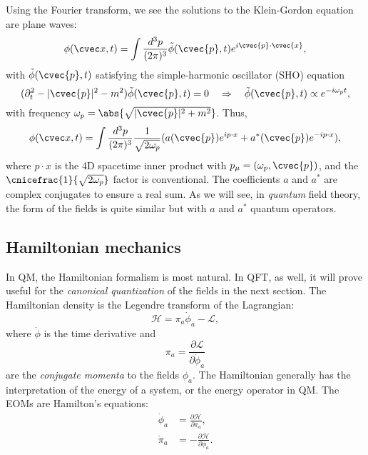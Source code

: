 Using the Fourier transform, we see the solutions to the Klein-Gordon equation are plane waves:
\begin{equation}
	\label{eq:01_qft_field_kg_solutions}
	\phi(\cvec x, t) = \int \frac{d^3p}{(2\pi)^3} \tilde \phi(\cvec{p}, t) e^{i\cvec{p}\cdot\cvec{x}},
\end{equation}
with $\tilde \phi(\cvec{p}, t)$ satisfying the simple-harmonic oscillator (SHO) equation
\begin{equation}
	\label{eq:01_qft_field_kg_sho}
	(\partial_t^2 - |\cvec{p}|^2 - m^2)\tilde \phi(\cvec{p}, t) = 0 \quad \Rightarrow \quad \tilde \phi(\cvec{p}, t) \propto e^{-i\omega_p t},
\end{equation}
with frequency $\omega_p = \abs{\sqrt{|\cvec{p}|^2 + m^2}}$.
Thus, 
\begin{equation}
	\label{eq:01_qft_field_kg_solutions_final}
	\phi(\cvec x, t) = \int \frac{d^3p}{(2\pi)^3} \frac{1}{\sqrt{2\omega_p}} (a(\cvec{p})e^{ip\cdot x} + a^*(\cvec{p})e^{-ip\cdot x}),
\end{equation}
where $p\cdot x$ is the 4D spacetime inner product with $p_\mu = (\omega_p, \cvec{p})$, and the $\cnicefrac{1}{\sqrt{2\omega_p}}$ factor is conventional.
The coefficients $a$ and $a^*$ are complex conjugates to ensure a real sum.
As we will see, in \textit{quantum} field theory, the form of the fields is quite similar but with $a$ and $a^*$ quantum operators.


\subsection{Hamiltonian mechanics}

In QM, the Hamiltonian formalism is most natural.
In QFT, as well, it will prove useful for the \textit{canonical quantization} of the fields in the next section.
The Hamiltonian density is the Legendre transform of the Lagrangian:
\begin{equation}
	\label{eq:01_qft_hamiltonian}
	\mathcal H = \pi_a\dot\phi_a - \mathcal{L},
\end{equation}
where $\dot\phi$ is the time derivative and
\begin{equation}
	\label{eq:01_qft_hamiltonian_momenta}
	\pi_a = \frac{\partial\mathcal L}{\partial\dot\phi_a}
\end{equation}
are the \textit{conjugate momenta} to the fields $\phi_a$.
The Hamiltonian generally has the interpretation of the energy of a system, or the energy operator in QM.
The EOMs are Hamilton's equations:
\begin{equation}
	\label{eq:01_qft_hamiltonian_eoms}
	\begin{split}
		\dot\phi_a &= \frac{\partial\mathcal H}{\partial\pi_a}, \\
		\dot\pi_a &= -\frac{\partial\mathcal H}{\partial\phi_a}.
	\end{split}
\end{equation}

